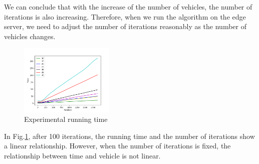 \documentclass[conference]{IEEEtran}
\begin{document}
We can conclude that with the increase of the number of vehicles, the number of iterations is also increasing. 
Therefore, when we run the algorithm on the edge server, we need to adjust the number of iterations reasonably as the number of vehicles changes. 
\begin{figure}[htbp]
	\centering
	\includegraphics[width=0.40\textwidth]{time.png}
	\caption{Experimental running time}
	\label{time}
\end{figure}

In Fig.\ref{time}, after 100 iterations, the running time and the number of iterations show a linear relationship. However, when the number of iterations is fixed, the relationship between time and vehicle is not linear. 
\end{document}
